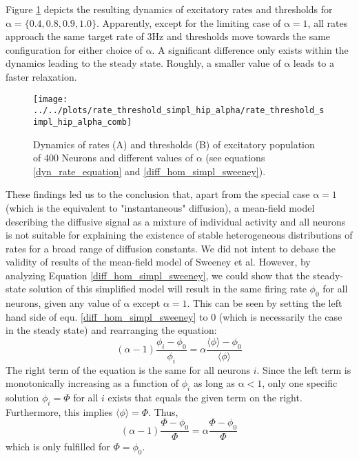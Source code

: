 \documentclass[10pt,a4paper]{article}
\begin{document}
Figure \ref{dynamics_rate_threshold_dyn_mean_field_sweeney} depicts the resulting dynamics of excitatory rates and thresholds for $\mathrm{\alpha=\lbrace 0.4,0.8,0.9,1.0\rbrace}$. Apparently, except for the limiting case of $\mathrm{\alpha=1}$, all rates approach the same target rate of $\mathrm{3Hz}$ and thresholds move towards the same configuration for either choice of $\mathrm{\alpha}$. A significant difference only exists within the dynamics leading to the steady state. Roughly, a smaller value of $\mathrm{\alpha}$ leads to a faster relaxation.
\begin{figure}
\texttt{[image: ../../plots/rate\_threshold\_simpl\_hip\_alpha/rate\_threshold\_simpl\_hip\_alpha\_comb]}
\caption{Dynamics of rates (A) and thresholds (B) of excitatory population of 400 Neurons and different values of $\mathrm{\alpha}$ (see equations \eqref{dyn_rate_equation} and \eqref{diff_hom_simpl_sweeney}).}
\label{dynamics_rate_threshold_dyn_mean_field_sweeney}
\end{figure}
These findings led us to the conclusion that, apart from the special case $\mathrm{\alpha=1}$ (which is the equivalent to "instantaneous" diffusion), a mean-field model describing the diffusive signal as a mixture of individual activity and all neurons is not suitable for explaining the existence of stable heterogeneous distributions of rates for a broad range of diffusion constants. We did not intent to debase the validity of results of the mean-field model of Sweeney et al. However, by analyzing Equation \ref{diff_hom_simpl_sweeney}, we could show that the steady-state solution of this simplified model will result in the same firing rate $\phi_0$ for all neurons, given any value of $\mathrm{\alpha}$ except $\mathrm{\alpha=1}$. This can be seen by setting the left hand side of equ. \eqref{diff_hom_simpl_sweeney} to $0$ (which is necessarily the case in the steady state) and rearranging the equation:
\begin{equation}
(\alpha-1)\frac{\phi_i - \phi_0}{\phi_i} = \alpha \frac{\langle \phi \rangle - \phi_0}{\langle \phi \rangle}
\label{diff_hom_simpl_sweeney_2}
\end{equation}
The right term of the equation is the same for all neurons $i$. Since the left term is monotonically increasing as a function of $\phi_i$ as long as $\mathrm{\alpha<1}$, only one specific solution $\phi_i = \Phi$ for all $i$ exists that equals the given term on the right. Furthermore, this implies $\langle \phi \rangle = \Phi$. Thus,
\begin{equation}
(\alpha-1)\frac{\Phi - \phi_0}{\Phi} = \alpha \frac{\Phi - \phi_0}{\Phi}
\label{diff_hom_simpl_sweeney_3}
\end{equation}
which is only fulfilled for $\Phi = \phi_0$.
\end{document}
